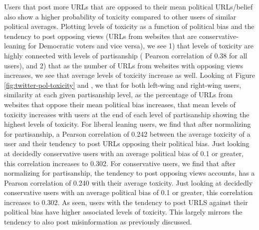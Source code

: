 Users that post more URLs that are opposed to their mean political URLs/belief also show a higher probability of toxicity compared to other users of similar political averages. Plotting levels of toxicity as a function of political bias and the tendency to post opposing views (URLs from websites that are conservative-leaning for Democratic voters and vice versa), we see 1) that levels of toxicity are highly connected with levels of partisanship ( Pearson correlation of 0.38 for all users), and 2) that as the number of URLs from websites with opposing views increases, we see that average levels of toxicity increase as well. Looking at Figure \ref{fig:twitter-pol-toxicity} and , we  that for both left-wing and right-wing users, similarity at each given partisanship level, as the percentage of URLs from websites that oppose their mean political bias increases, that mean levels of toxicity increases with users at the end of each level of partisanship showing the highest levels of toxicity. For liberal leaning users, we find that after normalizing for partisanship, a Pearson correlation of 0.242 between the average toxicity of a user and their tendency to post URLs opposing their political bias. Just looking at decidedly conservative users with an average political bias of 0.1 or greater, this correlation increases to 0.302. For conservative users, we find that after normalizing for partisanship, the tendency to post opposing views accounts, has a Pearson correlation of 0.240 with their average toxicity. Just looking at decidedly conservative users with an average political bias of 0.1 or greater, this correlation increases to 0.302. As seen, users with the tendency to post URLS against their political bias have higher associated levels of toxicity. This largely mirrors  the tendency to also post misinformation as previously discussed. 

